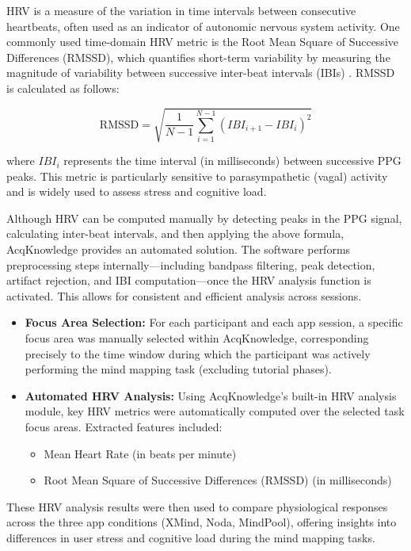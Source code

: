 \documentclass{CPP}
\begin{document}
HRV is a measure of the variation in time intervals between consecutive heartbeats, often used as an indicator of autonomic nervous system activity. One commonly used time-domain HRV metric is the Root Mean Square of Successive Differences (RMSSD), which quantifies short-term variability by measuring the magnitude of variability between successive inter-beat intervals (IBIs) \cite{taskforce1996}. RMSSD is calculated as follows:

\[
\text{RMSSD} = \sqrt{ \frac{1}{N-1} \sum_{i=1}^{N-1} (IBI_{i+1} - IBI_i)^2 }
\]

where \( IBI_i \) represents the time interval (in milliseconds) between successive PPG peaks. This metric is particularly sensitive to parasympathetic (vagal) activity and is widely used to assess stress and cognitive load.

Although HRV can be computed manually by detecting peaks in the PPG signal, calculating inter-beat intervals, and then applying the above formula, AcqKnowledge provides an automated solution. The software performs preprocessing steps internally—including bandpass filtering, peak detection, artifact rejection, and IBI computation—once the HRV analysis function is activated. This allows for consistent and efficient analysis across sessions.

\begin{itemize}
    \item \textbf{Focus Area Selection:} For each participant and each app session, a specific focus area was manually selected within AcqKnowledge, corresponding precisely to the time window during which the participant was actively performing the mind mapping task (excluding tutorial phases).
    \item \textbf{Automated HRV Analysis:} Using AcqKnowledge’s built-in HRV analysis module, key HRV metrics were automatically computed over the selected task focus areas. Extracted features included:
    \begin{itemize}
        \item Mean Heart Rate (in beats per minute)
        \item Root Mean Square of Successive Differences (RMSSD) (in milliseconds)
    \end{itemize}
\end{itemize}

These HRV analysis results were then used to compare physiological responses across the three app conditions (XMind, Noda, MindPool), offering insights into differences in user stress and cognitive load during the mind mapping tasks.
\end{document}
